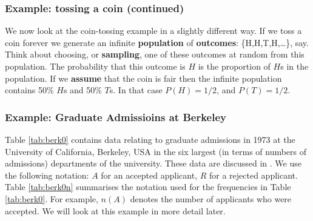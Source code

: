 \documentclass[
  11pt,
  british,
  openany, a4paper]{book}
\begin{document}
\hypertarget{example-tossing-a-coin-continued}{%
\subsubsection*{Example: tossing a coin (continued)}\label{example-tossing-a-coin-continued}}

We now look at the coin-tossing example in a slightly different way. If we toss a coin forever we generate an infinite \textbf{population} of \textbf{outcomes}: \{H,H,T,H,\ldots \}, say. Think about choosing, or \textbf{sampling}, one of these outcomes at random from this population. The probability that this outcome is \(H\) is the proportion of \(H\)s in the population. If we \textbf{assume} that the coin is fair then the infinite population contains 50\% \(H\)s and 50\% \(T\)s. In that case \(P(H)=1/2\), and \(P(T)=1/2\).

\hypertarget{example-graduate-admissioins-at-berkeley}{%
\subsubsection*{Example: Graduate Admissioins at Berkeley}\label{example-graduate-admissioins-at-berkeley}}

Table \ref{tab:berk0} contains data relating to graduate admissions in 1973 at the University of California, Berkeley, USA in the six largest (in terms of numbers of admissions) departments of the university. These data are discussed in \citet{berkeley}. We use the following notation: \(A\) for an accepted applicant, \(R\) for a rejected applicant. Table \ref{tab:berk0n} summarises the notation used for the frequencies in Table \ref{tab:berk0}. For example, \(n(A)\) denotes the number of applicants who were accepted. We will look at this example in more detail later.

 
  \providecommand{\huxb}[2]{\arrayrulecolor[RGB]{#1}\global\arrayrulewidth=#2pt}
  \providecommand{\huxvb}[2]{\color[RGB]{#1}\vrule width #2pt}
  \providecommand{\huxtpad}[1]{\rule{0pt}{#1}}
  \providecommand{\huxbpad}[1]{\rule[-#1]{0pt}{#1}}
\end{document}
